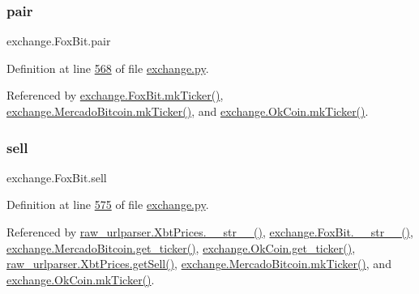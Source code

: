 \subsubsection{\texorpdfstring{pair}{pair}}
{\footnotesize\ttfamily exchange.\+Fox\+Bit.\+pair}



Definition at line \hyperlink{exchange_8py_source_l00568}{568} of file \hyperlink{exchange_8py_source}{exchange.\+py}.



Referenced by \hyperlink{exchange_8py_source_l00584}{exchange.\+Fox\+Bit.\+mk\+Ticker()}, \hyperlink{exchange_8py_source_l00665}{exchange.\+Mercado\+Bitcoin.\+mk\+Ticker()}, and \hyperlink{exchange_8py_source_l00730}{exchange.\+Ok\+Coin.\+mk\+Ticker()}.

\mbox{\label{classexchange_1_1_fox_bit_ac1fae4ef7a43254b71d7173a5cc6eeaf}} 
\subsubsection{\texorpdfstring{sell}{sell}}
{\footnotesize\ttfamily exchange.\+Fox\+Bit.\+sell}



Definition at line \hyperlink{exchange_8py_source_l00575}{575} of file \hyperlink{exchange_8py_source}{exchange.\+py}.



Referenced by \hyperlink{raw__urlparser_8py_source_l00074}{raw\+\_\+urlparser.\+Xbt\+Prices.\+\_\+\+\_\+str\+\_\+\+\_\+()}, \hyperlink{exchange_8py_source_l00610}{exchange.\+Fox\+Bit.\+\_\+\+\_\+str\+\_\+\+\_\+()}, \hyperlink{exchange_8py_source_l00651}{exchange.\+Mercado\+Bitcoin.\+get\+\_\+ticker()}, \hyperlink{exchange_8py_source_l00716}{exchange.\+Ok\+Coin.\+get\+\_\+ticker()}, \hyperlink{raw__urlparser_8py_source_l00065}{raw\+\_\+urlparser.\+Xbt\+Prices.\+get\+Sell()}, \hyperlink{exchange_8py_source_l00665}{exchange.\+Mercado\+Bitcoin.\+mk\+Ticker()}, and \hyperlink{exchange_8py_source_l00730}{exchange.\+Ok\+Coin.\+mk\+Ticker()}.

\mbox{\label{classexchange_1_1_fox_bit_a7ba3f64a2b55479da2239393c6140ec8}} 
